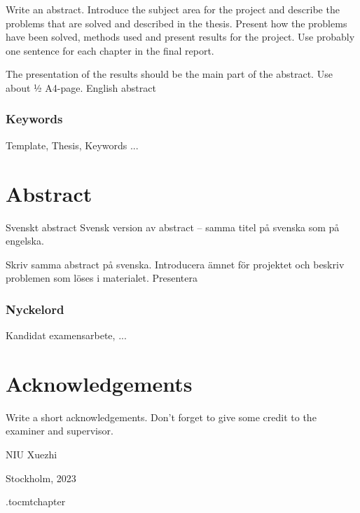 \vspace{2cm}
Write an abstract. Introduce the subject area for the project and describe the problems that are solved and described in the thesis. Present how the problems have been solved, methods used and present results for the project. Use probably one sentence for each chapter in the final report.

The presentation of the results should be the main part of the abstract. Use about ½ A4-page.
English abstract




\subsection*{Keywords}
Template, Thesis, Keywords ...





\newpage
\thispagestyle{plain}
\chapter*{Abstract}
Svenskt abstract
Svensk version av abstract – samma titel på svenska som på engelska.

Skriv samma abstract på svenska. Introducera ämnet för projektet och beskriv problemen som löses i materialet. Presentera 

\subsection*{Nyckelord}
Kandidat examensarbete, ...


\newpage
\thispagestyle{plain}
\chapter*{Acknowledgements}
Write a short acknowledgements. Don't forget to give some credit to the examiner and supervisor.

\vspace{2cm}
\hfill NIU Xuezhi 

\hfill Stockholm, \monthname{ }2023

\newpage



\newpage

\etocdepthtag.toc{mtchapter}
\thispagestyle{plain}
\tableofcontents

\newpage


